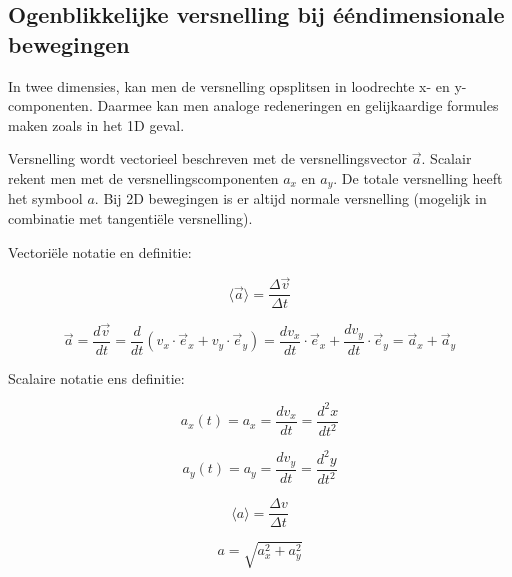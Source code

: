 \documentclass{ximera}
\begin{document}
	
\subsection*{Ogenblikkelijke versnelling bij ééndimensionale bewegingen}
	
In twee dimensies, kan men de versnelling opsplitsen in loodrechte x- en y-componenten. Daarmee kan men analoge redeneringen en gelijkaardige formules maken zoals in het 1D geval.
	


Versnelling wordt vectorieel beschreven met de versnellingsvector $\vec{a}$. 
Scalair rekent men met de versnellingscomponenten $a_x$ en $a_y$. 
De totale versnelling heeft het symbool $a$. 
Bij 2D bewegingen is er altijd normale versnelling (mogelijk in combinatie met tangentiële versnelling).

Vectoriële notatie en definitie:
	
\[
\langle \vec{a} \rangle = \frac{\Delta \vec{v}}{\Delta t}
\]

\[
\vec{a} = \frac{d\vec{v}}{dt} 
= \frac{d}{dt}(v_x \cdot \vec{e}_x + v_y \cdot \vec{e}_y) 
= \frac{dv_x}{dt} \cdot \vec{e}_x + \frac{dv_y}{dt} \cdot \vec{e}_y 
= \vec{a}_x + \vec{a}_y
\]

Scalaire notatie ens definitie:

\[
a_x(t) = a_x = \frac{dv_x}{dt} = \frac{d^2x}{dt^2}
\]

\[
a_y(t) = a_y = \frac{dv_y}{dt} = \frac{d^2y}{dt^2}
\]

\[
\langle a \rangle = \frac{\Delta v}{\Delta t}
\]

\[
a = \sqrt{a_x^2 + a_y^2}
\]
\end{document}
